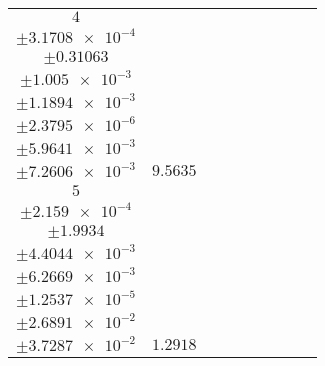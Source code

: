 \documentclass[8pt]{article}
\begin{document}
\begin{longtable}[l]{c c c c c c c c c}
$\num{4}$ & \begin{tabular}[c]{@{}c@{}}$\num{6.2116e-2}$ \\ $\pm\num{3.1708e-4}$\end{tabular} & \begin{tabular}[c]{@{}c@{}}$\num{-2.0729}$ \\ $\pm\num{0.31063}$\end{tabular} & \begin{tabular}[c]{@{}c@{}}$\num{0.51359}$ \\ $\pm\num{1.005e-3}$\end{tabular} & \begin{tabular}[c]{@{}c@{}}$\num{3.548e+3}$ \\ $\pm\num{1.1894e-3}$\end{tabular} & \begin{tabular}[c]{@{}c@{}}$\num{7.0979}$ \\ $\pm\num{2.3795e-6}$\end{tabular} & \begin{tabular}[c]{@{}c@{}}$\num{1.0211}$ \\ $\pm\num{5.9641e-3}$\end{tabular} & \begin{tabular}[c]{@{}c@{}}$\num{0.98654}$ \\ $\pm\num{7.2606e-3}$\end{tabular} & $\num{9.5635}$\\
$\num{5}$ & \begin{tabular}[c]{@{}c@{}}$\num{6.5111e-3}$ \\ $\pm\num{2.159e-4}$\end{tabular} & \begin{tabular}[c]{@{}c@{}}$\num{5.5519e-2}$ \\ $\pm\num{1.9934}$\end{tabular} & \begin{tabular}[c]{@{}c@{}}$\num{-15.82}$ \\ $\pm\num{4.4044e-3}$\end{tabular} & \begin{tabular}[c]{@{}c@{}}$\num{3.5481e+3}$ \\ $\pm\num{6.2669e-3}$\end{tabular} & \begin{tabular}[c]{@{}c@{}}$\num{7.0981}$ \\ $\pm\num{1.2537e-5}$\end{tabular} & \begin{tabular}[c]{@{}c@{}}$\num{0.58374}$ \\ $\pm\num{2.6891e-2}$\end{tabular} & \begin{tabular}[c]{@{}c@{}}$\num{0.57622}$ \\ $\pm\num{3.7287e-2}$\end{tabular} & $\num{1.2918}$\\

\end{longtable}
\end{document}
